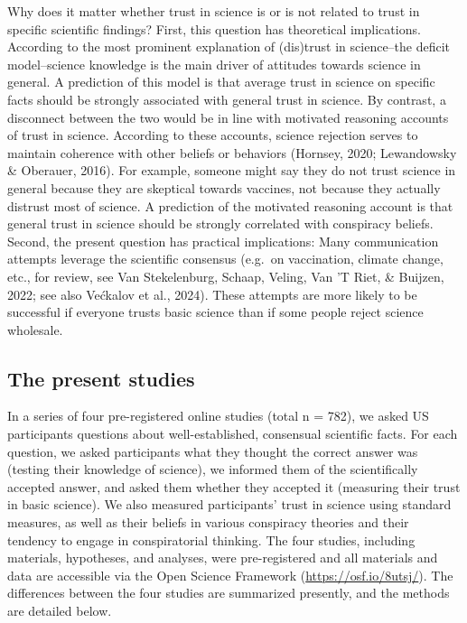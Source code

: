 \documentclass[
  doc,floatsintext]{apa6}
\begin{document}
Why does it matter whether trust in science is or is not related to trust in specific scientific findings? First, this question has theoretical implications. According to the most prominent explanation of (dis)trust in science--the deficit model--science knowledge is the main driver of attitudes towards science in general. A prediction of this model is that average trust in science on specific facts should be strongly associated with general trust in science. By contrast, a disconnect between the two would be in line with motivated reasoning accounts of trust in science. According to these accounts, science rejection serves to maintain coherence with other beliefs or behaviors (Hornsey, 2020; Lewandowsky \& Oberauer, 2016). For example, someone might say they do not trust science in general because they are skeptical towards vaccines, not because they actually distrust most of science. A prediction of the motivated reasoning account is that general trust in science should be strongly correlated with conspiracy beliefs. Second, the present question has practical implications: Many communication attempts leverage the scientific consensus (e.g.~on vaccination, climate change, etc., for review, see Van Stekelenburg, Schaap, Veling, Van 'T Riet, \& Buijzen, 2022; see also Većkalov et al., 2024). These attempts are more likely to be successful if everyone trusts basic science than if some people reject science wholesale.

\subsection{The present studies}\label{the-present-studies}

In a series of four pre-registered online studies (total n = 782), we asked US participants questions about well-established, consensual scientific facts. For each question, we asked participants what they thought the correct answer was (testing their knowledge of science), we informed them of the scientifically accepted answer, and asked them whether they accepted it (measuring their trust in basic science). We also measured participants' trust in science using standard measures, as well as their beliefs in various conspiracy theories and their tendency to engage in conspiratorial thinking. The four studies, including materials, hypotheses, and analyses, were pre-registered and all materials and data are accessible via the Open Science Framework (\url{https://osf.io/8utsj/}). The differences between the four studies are summarized presently, and the methods are detailed below.
\end{document}
